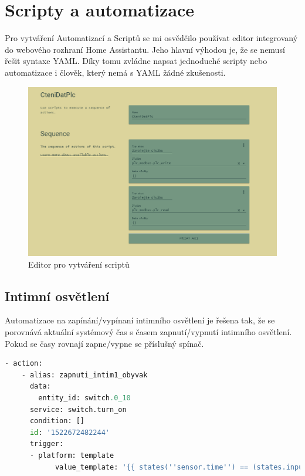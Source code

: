 \documentclass[a4paper,12pt,czech,bibliography=totoc]{scrbook}
\begin{document}
\section{Scripty a automatizace}
Pro vytváření Automatizací a Scriptů se mi osvědčilo používat editor integrovaný do webového rozhraní Home Assistantu. Jeho hlavní výhodou je, že se nemusí řešit syntaxe YAML. Díky tomu zvládne napsat jednoduché scripty nebo automatizace i člověk, který nemá s YAML žádné zkušenosti.
	\begin{figure}[h]
		\centering
		\includegraphics[scale = 0.3]{scriptEditor.PNG}
		\caption{Editor pro vytváření scriptů}
		\label{fig:my_label}
	\end{figure}
	\subsection{Intimní osvětlení}
	Automatizace na zapínání/vypínaní intimního osvětlení je řešena tak, že se porovnává aktuální systémový čas s časem zapnutí/vypnutí intimního osvětlení. Pokud se časy rovnají  zapne/vypne se příslušný spínač. 
		\begin{lstlisting}[language=Python]
- action:
	- alias: zapnuti_intim1_obyvak
	  data:
		entity_id: switch.0_10
	  service: switch.turn_on  
      condition: []
      id: '1522672482244'
      trigger:
      - platform: template
	  		value_template: '{{ states(''sensor.time'') == (states.input_datetime.obyvak_intim1_od.attributes.timestamp| int | timestamp_custom(''%H:%M'', False)) }}'

	\end{lstlisting}
\end{document}
